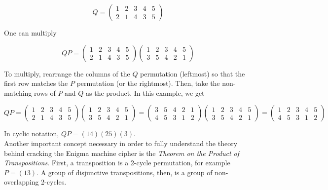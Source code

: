 $$Q = \begin{pmatrix}
    1 & 2 & 3 & 4 & 5 \\
    2 & 1 & 4 & 3 & 5
  \end{pmatrix}$$

One can multiply

$$QP = \begin{pmatrix}
    1 & 2 & 3 & 4 & 5 \\
    2 & 1 & 4 & 3 & 5
  \end{pmatrix}
  \begin{pmatrix}
    1 & 2 & 3 & 4 & 5 \\
    3 & 5 & 4 & 2 & 1
  \end{pmatrix}$$

To multiply, rearrange the columns of the $Q$ permutation (leftmost) so that the first row matches the $P$ permutation (or the rightmost). Then, take the non-matching rows of $P$ and $Q$ as the product. In this example, we get

$$QP = \begin{pmatrix}
    1 & 2 & 3 & 4 & 5 \\
    2 & 1 & 4 & 3 & 5
  \end{pmatrix}
  \begin{pmatrix}
    1 & 2 & 3 & 4 & 5 \\
    3 & 5 & 4 & 2 & 1
  \end{pmatrix} =
  \begin{pmatrix}
    3 & 5 & 4 & 2 & 1 \\
    4 & 5 & 3 & 1 & 2
  \end{pmatrix}
  \begin{pmatrix}
    1 & 2 & 3 & 4 & 5 \\
    3 & 5 & 4 & 2 & 1
  \end{pmatrix} =
  \begin{pmatrix}
    1 & 2 & 3 & 4 & 5 \\
    4 & 5 & 3 & 1 & 2
  \end{pmatrix}
  $$

In cyclic notation, $QP = (1 4)(2 5)(3)$.
\\

Another important concept necessary in order to fully understand the theory behind cracking the Enigma machine cipher is the \textit{Theorem on the Product of Transpositions}. First, a transposition is a 2-cycle permutation, for example $P = (13)$. A group of disjunctive transpositions, then, is a group of non-overlapping 2-cycles.
\\

